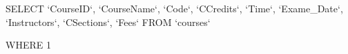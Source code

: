 SELECT `CourseID`, `CourseName`, `Code`, `CCredits`, `Time`, `Exame_Date`, `Instructors`, `CSections`, `Fees` FROM `courses`

WHERE 1